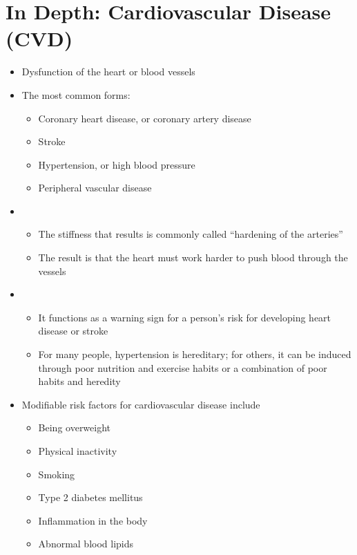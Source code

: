 \documentclass[title={Chapter 5}]{fdsn201notes}
\begin{document}
\section{In Depth: Cardiovascular Disease (CVD)}\label{sec:in-depth:-cardiovascular-disease}
\begin{itemize}
	\item Dysfunction of the heart or blood vessels
	\item The most common forms:
	\begin{itemize}
		\item Coronary heart disease, or coronary artery disease
		\item Stroke
		\item Hypertension, or high blood pressure
		\item Peripheral vascular disease
	\end{itemize}
	\item {}
	\begin{itemize}
		\item The stiffness that results is commonly called ``hardening of the arteries''
		\item The result is that the heart must work harder to push blood through the vessels
	\end{itemize}
	\item {}
	\begin{itemize}
		\item It functions as a warning sign for a person's risk for developing heart disease or stroke
		\item For many people, hypertension is hereditary; for others, it can be induced through poor nutrition and exercise habits or a combination of poor habits and heredity
	\end{itemize}
	\item Modifiable risk factors for cardiovascular disease include
	\begin{itemize}
		\item Being overweight
		\item Physical inactivity
		\item Smoking
		\item Type 2 diabetes mellitus
		\item Inflammation in the body
		\item Abnormal blood lipids
	\end{itemize}

\end{itemize}
\end{document}
